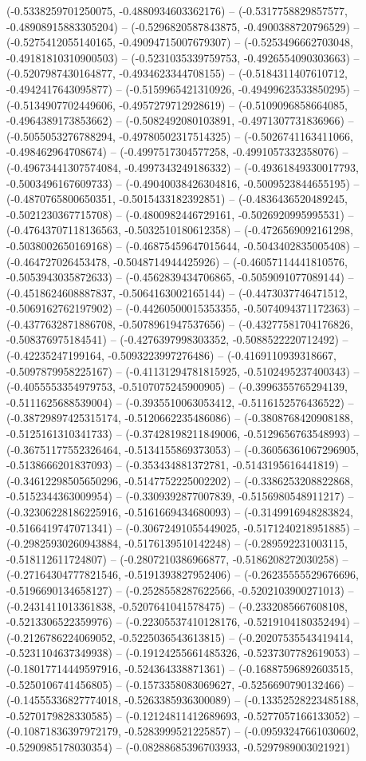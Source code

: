 (-0.5338259701250075, -0.4880934603362176) -- (-0.5317758829857577, -0.48908915883305204) -- (-0.5296820587843875, -0.4900388720796529) -- (-0.5275412055140165, -0.49094715007679307) -- (-0.5253496662703048, -0.49181810310900503) -- (-0.5231035339759753, -0.4926554090303663) -- (-0.5207987430164877, -0.4934623344708155) -- (-0.5184311407610712, -0.4942417643095877) -- (-0.5159965421310926, -0.49499623533850295) -- (-0.5134907702449606, -0.4957279712928619) -- (-0.5109096858664085, -0.4964389173853662) -- (-0.5082492080103891, -0.4971307731836966) -- (-0.5055053276788294, -0.49780502317514325) -- (-0.5026741163411066, -0.498462964708674) -- (-0.4997517304577258, -0.4991057332358076) -- (-0.49673441307574084, -0.4997343249186332) -- (-0.49361849330017793, -0.5003496167609733) -- (-0.49040038426304816, -0.5009523844655195) -- (-0.4870765800650351, -0.5015433182392851) -- (-0.4836436520489245, -0.5021230367715708) -- (-0.4800982446729161, -0.5026920995995531) -- (-0.47643707118136563, -0.5032510180612358) -- (-0.4726569092161298, -0.5038002650169168) -- (-0.46875459647015644, -0.5043402835005408) -- (-0.464727026453478, -0.5048714944425926) -- (-0.46057114441810576, -0.5053943035872633) -- (-0.4562839434706865, -0.5059091077089144) -- (-0.4518624608887837, -0.5064163002165144) -- (-0.4473037746471512, -0.5069162762197902) -- (-0.44260500015353355, -0.5074094371172363) -- (-0.4377632871886708, -0.5078961947537656) -- (-0.43277581704176826, -0.508376975184541) -- (-0.4276397998303352, -0.5088522220712492) -- (-0.42235247199164, -0.5093223997276486) -- (-0.4169110939318667, -0.5097879958225167) -- (-0.41131294781815925, -0.5102495237400343) -- (-0.4055553354979753, -0.5107075245900905) -- (-0.3996355765294139, -0.5111625688539004) -- (-0.3935510063053412, -0.5116152576436522) -- (-0.38729897425315174, -0.5120662235486086) -- (-0.3808768420908188, -0.5125161310341733) -- (-0.37428198211849006, -0.5129656763548993) -- (-0.36751177552326464, -0.5134155869373053) -- (-0.36056361067296905, -0.5138666201837093) -- (-0.353434881372781, -0.5143195616441819) -- (-0.34612298505650296, -0.5147752225002202) -- (-0.3386253208822868, -0.5152344363009954) -- (-0.3309392877007839, -0.5156980548911217) -- (-0.32306228186225916, -0.5161669434680093) -- (-0.3149916948283824, -0.5166419747071341) -- (-0.30672491055449025, -0.5171240218951885) -- (-0.29825930260943884, -0.5176139510142248) -- (-0.289592231003115, -0.518112611724807) -- (-0.2807210386966877, -0.5186208272030258) -- (-0.27164304777821546, -0.5191393827952406) -- (-0.26235555529676696, -0.5196690134658127) -- (-0.2528558287622566, -0.5202103900271013) -- (-0.2431411013361838, -0.5207641041578475) -- (-0.2332085667608108, -0.5213306522359976) -- (-0.22305537410128176, -0.5219104180352494) -- (-0.2126786224069052, -0.5225036543613815) -- (-0.20207535543419414, -0.5231104637349938) -- (-0.19124255661485326, -0.5237307782619053) -- (-0.18017714449597916, -0.524364338871361) -- (-0.16887596892603515, -0.5250106741456805) -- (-0.1573358083069627, -0.5256690790132466) -- (-0.14555336827774018, -0.5263385936300089) -- (-0.13352528223485188, -0.5270179828330585) -- (-0.12124811412689693, -0.5277057166133052) -- (-0.10871836397972179, -0.5283999521225857) -- (-0.09593247661030602, -0.5290985178030354) -- (-0.08288685396703933, -0.5297989003021921) 